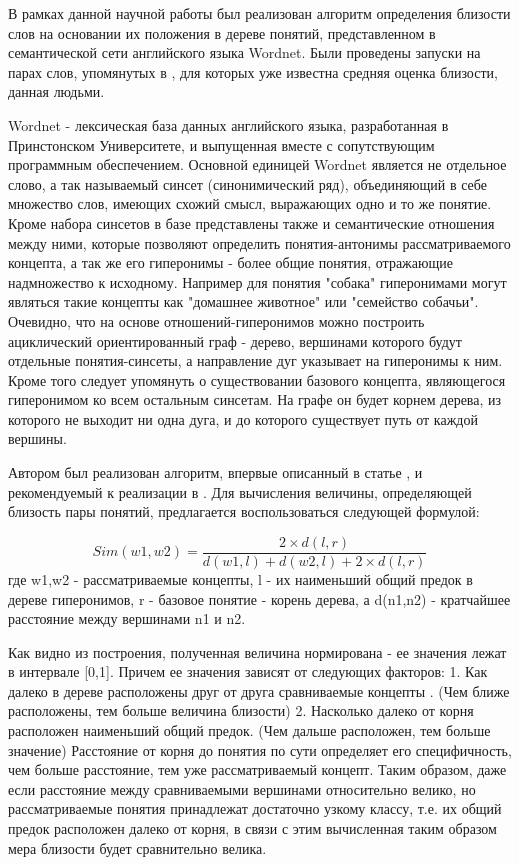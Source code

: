 В рамках данной научной работы был реализован алгоритм определения близости слов
на основании их положения в дереве понятий, представленном в семантической сети
английского языка Wordnet\cite{wordnet}.
Были проведены запуски на парах слов, упомянутых в \cite{complexSim},
для которых уже известна средняя оценка близости, данная людьми.

Wordnet\cite{wordnet} - лексическая база данных английского языка,
разработанная
в Принстонском Университете, и выпущенная вместе с сопутствующим
программным обеспечением.
Основной единицей Wordnet является не отдельное слово, а так
называемый синсет (синонимический ряд),
объединяющий в себе множество слов, имеющих схожий смысл, выражающих
одно и то же понятие.
Кроме набора синсетов в базе представлены также и семантические
отношения между ними,
которые позволяют определить понятия-антонимы рассматриваемого концепта,
а так же его гиперонимы - более общие понятия, отражающие надмножество
к исходному.
Например для понятия "собака" гиперонимами могут являться такие концепты
как "домашнее животное" или "семейство собачьи".
Очевидно, что на основе отношений-гиперонимов можно построить
ациклический ориентированный граф - дерево, вершинами которого
будут отдельные понятия-синсеты, а направление дуг указывает на
гиперонимы к ним.
Кроме того следует упомянуть о существовании базового концепта, являющегося
гиперонимом ко всем остальным синсетам. На графе он будет корнем дерева,
из которого не выходит ни одна дуга, и до которого существует путь от
каждой вершины.

Автором был реализован алгоритм, впервые описанный  в статье
\cite{inproceedings},
и рекомендуемый к реализации в \cite{complexSim}.
Для вычисления величины, определяющей близость пары понятий, предлагается
воспользоваться следующей формулой:

\begin{equation}
Sim(w1, w2) = \frac{ 2\times d(l, r) }
                               { d(w1, l) + d(w2, l) + 2\times d(l,r) }
\end{equation}
где w1,w2 - рассматриваемые концепты, l - их наименьший общий предок в
дереве гиперонимов,
r - базовое понятие - корень дерева, а d(n1,n2) - кратчайшее
расстояние между вершинами n1 и n2.

Как видно из построения, полученная величина нормирована - ее значения лежат
в интервале [0,1].
Причем ее значения зависят от следующих факторов:
1. Как далеко в дереве расположены друг от друга сравниваемые концепты .
 (Чем ближе расположены, тем больше величина близости)
2. Насколько далеко от корня расположен наименьший общий предок.
  (Чем дальше расположен, тем больше значение)
Расстояние от корня до понятия по сути определяет его специфичность,
чем больше расстояние, тем уже рассматриваемый концепт.
Таким образом, даже если расстояние между сравниваемыми вершинами
относительно велико, но рассматриваемые понятия принадлежат
достаточно узкому классу, т.е. их общий предок расположен далеко от корня,
в связи с  этим вычисленная таким образом мера близости будет
сравнительно велика.

